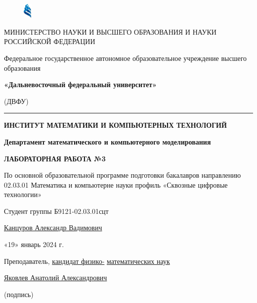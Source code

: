 \documentclass[a4paper, 12pt, fleqn]{article}
\begin{document}
\begin{titlepage}
\begin{figure}[!htb]
\centering
\includegraphics[width=0.04\textwidth]{fefu_logo.jpg}
\end{figure}
\begin{center}
\fontsize{10pt}{18pt}\selectfont
МИНИСТЕРСТВО НАУКИ И ВЫСШЕГО ОБРАЗОВАНИЯ И НАУКИ РОССИЙСКОЙ ФЕДЕРАЦИИ

Федеральное государственное автономное образовательное учреждение высшего образования

\textbf{«Дальневосточный федеральный университет»}

(ДВФУ)

\end{center}
\vspace{2mm}
\noindent\rule{\textwidth}{2pt}
\vspace{2mm}
\begin{center}
\textbf{ИНСТИТУТ МАТЕМАТИКИ И КОМПЬЮТЕРНЫХ ТЕХНОЛОГИЙ}

\vspace{12mm}
\textbf{Департамент математического и компьютерного моделирования}

\vspace{12mm}
\textbf{ЛАБОРАТОРНАЯ РАБОТА №3}

\vspace{3mm}
По основной образовательной программе подготовки бакалавров направлению 02.03.01 Математика и компьютерне науки профиль «Сквозные цифровые технологии»
\vspace{9mm}
\end{center}
\hfill
\begin{minipage}[t]{0.5\textwidth}
\raggedright
Студент группы Б9121-02.03.01сцт

\vspace{2mm}
\underline{Канцуров Александр Вадимович}

\vspace{2mm}
«19» январь 2024 г.

\vspace{24pt}
Преподаватель, \underline{кандидат физико-} \underline{математических наук\phantom{qqqqqqqqqqq}}

\vspace{2mm}
\underline{Яковлев Анатолий Александрович}

\vspace{2mm}
\underline{\phantom{s}\hspace{5cm}} (подпись)


\end{minipage}
\end{titlepage}
\end{document}
